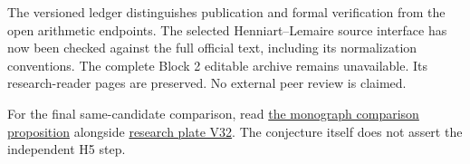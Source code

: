 The versioned ledger distinguishes publication and formal verification from the open arithmetic endpoints. The selected Henniart--Lemaire source interface has now been checked against the full official text, including its normalization conventions. The complete Block 2 editable archive remains unavailable. Its research-reader pages are preserved. No external peer review is claimed.

For the final same-candidate comparison, read \href{https://komorebi.invalid/b07/visual_comparison}{the monograph comparison proposition} alongside \href{https://komorebi.invalid/b07/visual_v32}{research plate V32}. The conjecture itself does not assert the independent H5 step.
